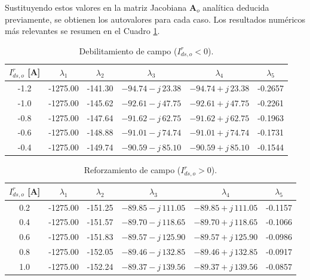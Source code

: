 \documentclass[12pt, a4paper,journal, onecolumn, compsoc]{IEEEtran}
\begin{document}
Sustituyendo estos valores en la matriz Jacobiana $\mathbf{A}_o$ analítica deducida previamente, se obtienen los autovalores para cada caso. Los resultados numéricos más relevantes se resumen en el Cuadro \ref{tab:migracion_polos}.


\begin{table}[H]
\centering
\caption{Debilitamiento de campo ($I^r_{ds,o}<0$).}
\label{tab:migracion_polos}
\begin{tabular}{|c|c|c|c|c|c|}
\hline
$I^r_{ds,o}$ [A] & $\lambda_1$ & $\lambda_2$ & $\lambda_3$ & $\lambda_4$ & $\lambda_5$ \\
\hline
-1.2 & -1275.00 & -141.30 & $-94.74 - j\,23.38$ & $-94.74 + j\,23.38$ & -0.2657 \\
-1.0 & -1275.00 & -145.62 & $-92.61 - j\,47.75$ & $-92.61 + j\,47.75$ & -0.2261 \\
-0.8 & -1275.00 & -147.64 & $-91.62 - j\,62.75$ & $-91.62 + j\,62.75$ & -0.1963 \\
-0.6 & -1275.00 & -148.88 & $-91.01 - j\,74.74$ & $-91.01 + j\,74.74$ & -0.1731 \\
-0.4 & -1275.00 & -149.74 & $-90.59 - j\,85.10$ & $-90.59 + j\,85.10$ & -0.1544 \\
\hline
\end{tabular}
\end{table}

\begin{table}[H]
\centering
\caption{Reforzamiento de campo ($I^r_{ds,o}>0$).}
\label{tab:migracion_polos_reforzamiento}
\begin{tabular}{|c|c|c|c|c|c|}
\hline
$I^r_{ds,o}$ [A] & $\lambda_1$ & $\lambda_2$ & $\lambda_3$ & $\lambda_4$ & $\lambda_5$ \\
\hline
0.2 & -1275.00 & -151.25 & $-89.85 - j\,111.05$ & $-89.85 + j\,111.05$ & -0.1157 \\
0.4 & -1275.00 & -151.57 & $-89.70 - j\,118.65$ & $-89.70 + j\,118.65$ & -0.1066 \\
0.6 & -1275.00 & -151.83 & $-89.57 - j\,125.90$ & $-89.57 + j\,125.90$ & -0.0986 \\
0.8 & -1275.00 & -152.05 & $-89.46 - j\,132.85$ & $-89.46 + j\,132.85$ & -0.0917 \\
1.0 & -1275.00 & -152.24 & $-89.37 - j\,139.56$ & $-89.37 + j\,139.56$ & -0.0857 \\
\hline
\end{tabular}
\end{table}
\end{document}

